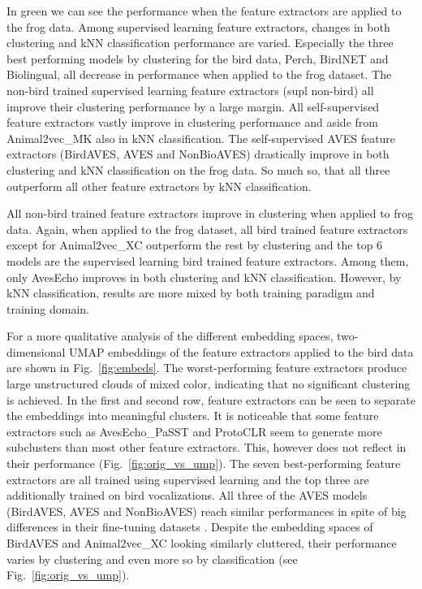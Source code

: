 In green we can see the performance when the feature extractors are applied to the frog data.
Among supervised learning feature extractors, changes in both clustering and kNN classification performance are varied.
Especially the three best performing models by clustering for the bird data, Perch, BirdNET and Biolingual, all decrease in performance when applied to the frog dataset.
The non-bird trained supervised learning feature extractors (supl non-bird) all improve their clustering performance by a large margin.
All self-supervised feature extractors vastly improve in clustering performance and aside from Animal2vec\_MK also in kNN classification.
The self-supervised AVES feature extractors (BirdAVES, AVES and NonBioAVES) drastically improve in both clustering and kNN classification on the frog data.
So much so, that all three outperform all other feature extractors by kNN classification.

All non-bird trained feature extractors improve in clustering when applied to frog data.
Again, when applied to the frog dataset, all bird trained feature extractors except for Animal2vec\_XC outperform the rest by clustering and the top 6 models are the supervised learning bird trained feature extractors.
Among them, only AvesEcho improves in both clustering and kNN classification.
However, by kNN classification, results are more mixed by both training paradigm and training domain.


For a more qualitative analysis of the different embedding spaces, two-dimensional UMAP embeddings of the feature extractors applied to the bird data are shown in Fig.~\ref{fig:embeds}.
The worst-performing feature extractors produce large unstructured clouds of mixed color, indicating that no significant clustering is achieved.
In the first and second row, feature extractors can be seen to separate the embeddings into meaningful clusters.
It is noticeable that some feature extractors such as AvesEcho\_PaSST and ProtoCLR seem to generate more subclusters than most other feature extractors.
This, however does not reflect in their performance (Fig.~\ref{fig:orig_vs_ump}).
The seven best-performing feature extractors are all trained using supervised learning and the top three are additionally trained on bird vocalizations.
All three of the AVES models (BirdAVES, AVES and NonBioAVES) reach similar performances in spite of big differences in their fine-tuning datasets \cite{hagiwara_aves_2022}.
Despite the embedding spaces of BirdAVES and Animal2vec\_XC looking similarly cluttered, their performance varies by clustering and even more so by classification (see Fig.~\ref{fig:orig_vs_ump}).


